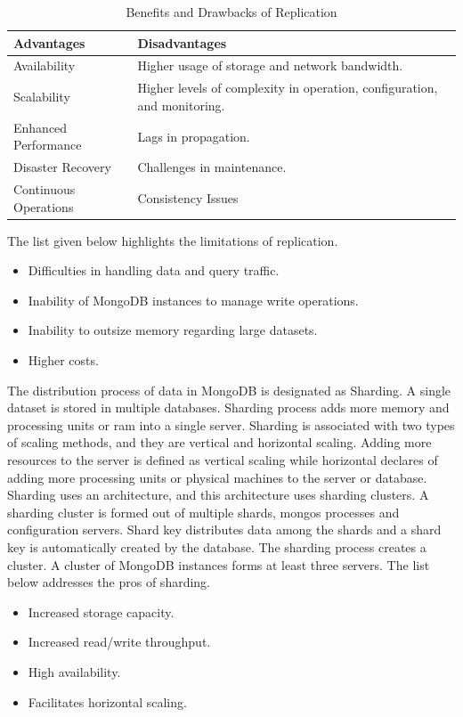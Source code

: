 \documentclass[a4Paper,12pt]{report}
\begin{document}
\begin{table}[H]
\centering
\begin{tabularx}{\textwidth}{XX}\hline
Advantages & Disadvantages\\\hline
Availability & Higher usage of storage and network bandwidth.\\
Scalability & Higher levels of complexity in operation, configuration, and monitoring.\\
Enhanced Performance & Lags in propagation.\\
Disaster Recovery & Challenges in maintenance.\\
Continuous Operations & Consistency Issues\\\hline
\end{tabularx}
\caption{Benefits and Drawbacks of Replication}
\end{table}
The list given below highlights the limitations of replication.
\begin{itemize}
\item Difficulties in handling data and query traffic.
\item Inability of MongoDB instances to manage write operations. 
\item Inability to outsize memory regarding large datasets.
\item Higher costs.
\end{itemize}
The distribution process of data in MongoDB is designated as Sharding. A single dataset is stored in multiple databases. Sharding process adds more memory and processing units or ram into a single server. Sharding is associated with two types of scaling methods, and they are vertical and horizontal scaling. Adding more resources to the server is defined as vertical scaling while horizontal declares of adding more processing units or physical machines to the server or database. Sharding uses an architecture, and this architecture uses sharding clusters. A sharding cluster is formed out of multiple shards, mongos processes and configuration servers. Shard key distributes data among the shards and a shard key is automatically created by the database. The sharding process creates a cluster. A cluster of MongoDB instances forms at least three servers. The list below addresses the pros of sharding.
\begin{itemize}
\item Increased storage capacity.
\item Increased read/write throughput.
\item High availability.
\item Facilitates horizontal scaling.
\end{itemize}
\end{document}
